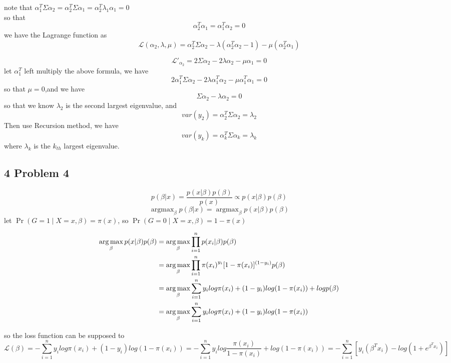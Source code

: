\documentclass[10pt,a4paper]{article}
\begin{document}
note that $ \alpha_1^T\Sigma\alpha_2 = \alpha_2^T\Sigma\alpha_1 =\alpha_2^T\lambda_1\alpha_1=0 $ \\
so that 
\[ \alpha_2^T\alpha_1=\alpha_1^T\alpha_2=0 \]
we have the Lagrange function as 
\[ \mathcal{L}(\alpha_2, \lambda, \mu)= \alpha_2^T \Sigma \alpha_2 - \lambda(\alpha_2^T\alpha_2 - 1 ) - \mu(\alpha_2^T\alpha_1) \]

\[ \mathcal{L}'_{\alpha_2}= 2\Sigma \alpha_2 - 2\lambda \alpha_2 - \mu\alpha_1=0 \]
let $\alpha_1^T$ left multiply the above formula, we have
\[ 2\alpha_1^T \Sigma \alpha_2 - 2\lambda\alpha_1^T \alpha_2 - \mu\alpha_1^T\alpha_1=0 \]
so that $\mu=0$,and we have
\[ \Sigma\alpha_2-\lambda\alpha_2=0 \]
so that we know $\lambda_2$ is the second largest eigenvalue, and 
\[ var(y_2)=\alpha_2^T \Sigma \alpha_2=\lambda_2 \]
Then use Recursion method, we have
\[ var(y_k)=\alpha_k^T \Sigma \alpha_k=\lambda_k \]
where $ \lambda_k $ is the $k_{th}$ largest eigenvalue.

\subsection{4 Problem 4}
\[ p(\beta|x)=\frac{p(x|\beta)p(\beta)}{p(x)} \propto p(x|\beta)p(\beta) \] 
\[ \mathop{\arg\max}_{\beta}p(\beta|x)=\mathop{\arg\max}_{\beta} p(x|\beta)p(\beta) \] 
let $\operatorname{Pr}(G=1 \mid X=x, \beta) = \pi(x)$, so $\operatorname{Pr}(G=0 \mid X=x, \beta) = 1- \pi(x)$

\begin{align}
	\mathop{\arg\max}_{\beta} p(x|\beta)p(\beta)
	& = \mathop{\arg\max}_{\beta} \prod_{i=1}^{n}p(x_i|\beta)p(\beta) \notag \\
	& = \mathop{\arg\max}_{\beta} \prod_{i=1}^{n}{\pi(x_i)}^{y_i}[1-\pi(x_i)]^{(1-y_i)}p(\beta) \notag \\
	& = \mathop{\arg\max}_{\beta}\sum_{i=1}^{n}y_i log\pi(x_i)+(1-y_i)log(1-\pi(x_i))+logp(\beta)	\notag \\
	& = \mathop{\arg\max}_{\beta}\sum_{i=1}^{n}y_i log\pi(x_i)+(1-y_i)log(1-\pi(x_i))	\notag 
\end{align}

so the loss function can be supposed to
\[ \mathcal{L}(\beta)=-\sum_{i=1}^{n}y_i log\pi(x_i)+(1-y_i)log(1-\pi(x_i))= -\sum_{i=1}^{n}y_i log\frac{\pi(x_i)}{1-\pi(x_i)}+log(1-\pi(x_i))= -\sum_{i=1}^{n}[y_i (\beta^Tx_i)-log(1+e^{\beta^Tx_i})] \]
\end{document}
